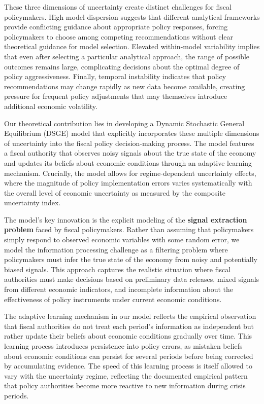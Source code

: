 \documentclass[5p,authoryear]{elsarticle}
\begin{document}
These three dimensions of uncertainty create distinct challenges for fiscal policymakers. High model dispersion suggests that different analytical frameworks provide conflicting guidance about appropriate policy responses, forcing policymakers to choose among competing recommendations without clear theoretical guidance for model selection. Elevated within-model variability implies that even after selecting a particular analytical approach, the range of possible outcomes remains large, complicating decisions about the optimal degree of policy aggressiveness. Finally, temporal instability indicates that policy recommendations may change rapidly as new data become available, creating pressure for frequent policy adjustments that may themselves introduce additional economic volatility.

Our theoretical contribution lies in developing a Dynamic Stochastic General Equilibrium (DSGE) model that explicitly incorporates these multiple dimensions of uncertainty into the fiscal policy decision-making process. The model features a fiscal authority that observes noisy signals about the true state of the economy and updates its beliefs about economic conditions through an adaptive learning mechanism. Crucially, the model allows for regime-dependent uncertainty effects, where the magnitude of policy implementation errors varies systematically with the overall level of economic uncertainty as measured by the composite uncertainty index.

The model's key innovation is the explicit modeling of the \textbf{signal extraction problem} faced by fiscal policymakers. Rather than assuming that policymakers simply respond to observed economic variables with some random error, we model the information processing challenge as a filtering problem where policymakers must infer the true state of the economy from noisy and potentially biased signals. This approach captures the realistic situation where fiscal authorities must make decisions based on preliminary data releases, mixed signals from different economic indicators, and incomplete information about the effectiveness of policy instruments under current economic conditions.

The adaptive learning mechanism in our model reflects the empirical observation that fiscal authorities do not treat each period's information as independent but rather update their beliefs about economic conditions gradually over time. This learning process introduces persistence into policy errors, as mistaken beliefs about economic conditions can persist for several periods before being corrected by accumulating evidence. The speed of this learning process is itself allowed to vary with the uncertainty regime, reflecting the documented empirical pattern that policy authorities become more reactive to new information during crisis periods.
\end{document}
